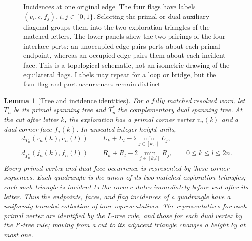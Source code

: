\documentclass[11pt]{article}
\numberwithin{equation}{section}
\newtheorem{lemma}[theorem]{Lemma}
\theoremstyle{definition}
\theoremstyle{remark}
\newcommand{\1}{\mathbf 1}
\begin{document}
\begin{figure}[ht]
\endgroup

\caption{Incidences at one original edge.  The four flags have labels
$(v_i,e,f_j)$, $i,j\in\{0,1\}$.  Selecting the primal or dual auxiliary
diagonal groups them into the two exploration triangles of the matched
letters.  The lower panels show the two pairings of the four interface
ports: an unoccupied edge pairs ports about each primal endpoint,
whereas an occupied edge pairs them about each incident face.
This is a topological schematic, not an isometric drawing of the
equilateral flags.  Labels may repeat for a loop or bridge, but the
four flag and port occurrences remain distinct.}
\label{enc:flag-quadrangle}
\end{figure}

\begin{lemma}[Tree and incidence identities]\label{enc:incidence}
For a fully matched resolved word, let $T_n$ be its primal spanning tree
and $T_n^*$ the complementary dual spanning tree.  At the cut after
letter $k$, the exploration has a primal corner vertex $v_n(k)$ and a
dual corner face $f_n(k)$.  In unscaled integer height units,
\begin{align*}
 d_{T_n}(v_n(k),v_n(l))
 &=L_k+L_l-2\min_{j\in[k,l]}L_j,\\
 d_{T_n^*}(f_n(k),f_n(l))
 &=R_k+R_l-2\min_{j\in[k,l]}R_j,
 \qquad 0\le k\le l\le2n.
\end{align*}
Every primal vertex and dual face occurrence is represented by these
corner sequences.  Each quadrangle is the union of its two matched
exploration triangles; each such triangle is incident to the corner
states immediately before and after its letter.  Thus the endpoints,
faces, and flag incidences of a quadrangle have a uniformly bounded
collection of tour representatives.  The representatives for each
primal vertex are identified by the $L$-tree rule, and those for each
dual vertex by the $R$-tree rule; moving from a cut to its adjacent
triangle changes a height by at most one.
\end{lemma}
\end{document}
